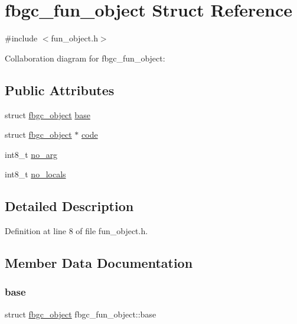 \hypertarget{structfbgc__fun__object}{}\section{fbgc\+\_\+fun\+\_\+object Struct Reference}
\label{structfbgc__fun__object}


{\ttfamily \#include $<$fun\+\_\+object.\+h$>$}



Collaboration diagram for fbgc\+\_\+fun\+\_\+object\+:
\subsection*{Public Attributes}
\begin{DoxyCompactItemize}
\item 
struct \hyperlink{structfbgc__object}{fbgc\+\_\+object} \hyperlink{structfbgc__fun__object_a0e114d117a48fc528c425a4349c129c1}{base}
\item 
struct \hyperlink{structfbgc__object}{fbgc\+\_\+object} $\ast$ \hyperlink{structfbgc__fun__object_ababc5d5bdec0e8779dc740716ba99be9}{code}
\item 
int8\+\_\+t \hyperlink{structfbgc__fun__object_af106fb302ed3e6c52cee66d9788a6d47}{no\+\_\+arg}
\item 
int8\+\_\+t \hyperlink{structfbgc__fun__object_aede4839acfb9685972872af368c22a40}{no\+\_\+locals}
\end{DoxyCompactItemize}


\subsection{Detailed Description}


Definition at line 8 of file fun\+\_\+object.\+h.



\subsection{Member Data Documentation}
\mbox{\label{structfbgc__fun__object_a0e114d117a48fc528c425a4349c129c1}} 
\subsubsection{\texorpdfstring{base}{base}}
{\footnotesize\ttfamily struct \hyperlink{structfbgc__object}{fbgc\+\_\+object} fbgc\+\_\+fun\+\_\+object\+::base}



